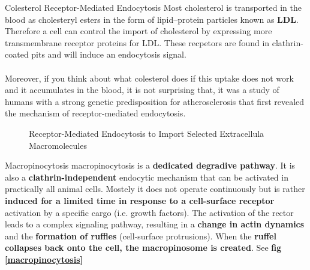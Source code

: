 \documentclass[../main.tex]{subfiles}
\begin{document}
\begin{ExWithTitle}{Colesterol Receptor-Mediated Endocytosis}
	Most cholesterol is transported in the blood as cholesteryl esters in the form of 
	lipid–protein particles known as \textbf{\gls{LDL}}. Therefore a cell can control the import of cholesterol by expressing more transmembrane receptor proteins for LDL. These recpetors are found in clathrin-coated pits and will induce an endocytosis signal.\\
	\\
	Moreover, if you think about what colesterol does if this uptake does not work and it accumulates in the blood, it is not surprising that, it was a study of humans with a strong genetic predisposition for atherosclerosis that first revealed the mechanism of receptor-mediated endocytosis.
\end{ExWithTitle}

\begin{figure}[H]
	\centering
	\caption{Receptor-Mediated Endocytosis to Import Selected Extracellula Macromolecules}
\end{figure}

\begin{RemarkWithTitel}{Macropinocytosis}
	\gls{macropinocytosis} is a \textbf{dedicated degradive pathway}. It is also a \textbf{clathrin-independent} endocytic mechanism that can be activated in practically all animal cells. Mostely it does not operate continuously but is rather \textbf{induced for a limited time in response to a cell-surface receptor} activation by a specific cargo (i.e. growth factors). The activation of the rector leads to a complex signaling pathway, resulting in a \textbf{change in actin dynamics} and the \textbf{formation of ruffles} (cell-surface protrusions). When the \textbf{ruffel collapses back onto the cell, the macropinosome is created}. See\textbf{ fig \ref{macropinocytosis}}
\end{RemarkWithTitel}
\end{document}
